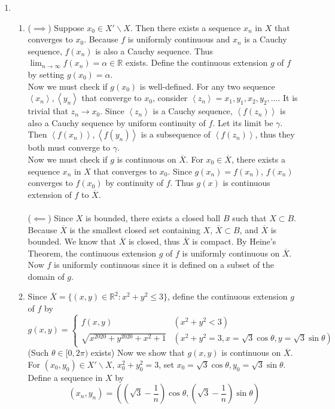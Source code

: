 \documentclass[11pt]{report}
\renewcommand{\span}[1]{\left\langle #1 \right\rangle}
\newcommand{\ra}{\rightarrow}
\newcommand{\bs}{\backslash}
\newcommand{\mimp}{$\implies$}
\newcommand{\R}{\mathbb{R}}
\begin{document}
\begin{enumerate}
\item 
\begin{enumerate}
	\item (\mimp) Suppose $x_0 \in X'\bs X$. Then there exists a sequence $x_n$ in $X$ that converges to $x_0$. Because $f$ is uniformly continuous and $x_n$ is a Cauchy sequence, $f(x_n)$ is also a Cauchy sequence. Thus $\lim_{n\ra\infty} f(x_n) = \alpha \in \R$ exists.  Define the continuous extension $g$ of $f$ by setting $g(x_0) = \alpha$.\\
	Now we must check if $g(x_0)$ is well-defined. For any two sequence $\span{x_n}, \span{y_n}$ that converge to $x_0$, consider $\span{z_n} = x_1, y_1, x_2, y_2, \dots$. It is trivial that $z_n\ra x_0$. Since $\span{z_n}$ is a Cauchy sequence, $\span{f(z_n)}$ is also a Cauchy sequence by uniform continuity of $f$. Let its limit be $\gamma$. Then $\span{f(x_n)}, \span{f(y_n)}$ is a subsequence of $\span{f(z_n)}$, thus they both must converge to $\gamma$.\\
	Now we must check if $g$ is continuous on $\overline{X}$. For $x_0\in \overline{X}$, there exists a sequence $x_n$ in $X$ that converges to $x_0$. Since $g(x_n) = f(x_n)$, $f(x_n)$ converges to $f(x_0)$ by continuity of $f$. Thus $g(x)$ is continuous extension of $f$ to $\overline{X}$.\\
	\\
	($\impliedby$) Since $X$ is bounded, there exists a closed ball $B$ such that $X\subset B$. Because $\overline{X}$ is the smallest closed set containing $X$, $\overline{X} \subset B$, and $\overline{X}$ is bounded. We know that $\overline{X}$ is closed, thus $\overline{X}$ is compact. By Heine's Theorem, the continuous extension $g$ of $f$ is uniformly continuous on $\overline{X}$. Now $f$ is uniformly continuous since it is defined on a subset of the domain of $g$.
	\item Since $\overline{X} = \{(x, y)\in \R^2: x^2+y^2\leq 3 \}$, define the continuous extension $g$ of $f$ by $$g(x, y) = \begin{cases}
		f(x, y) & (x^2+y^2 < 3)\\
		\sqrt{x^{2020} + y^{2020} + x^2 +1} & (x^2 + y^2 = 3, x = \sqrt{3}\cos\theta, y = \sqrt{3}\sin\theta)
	\end{cases}$$
	(Such $\theta \in [0, 2\pi)$ exists) Now we show that $g(x, y)$ is continuous on $\overline{X}$. For $(x_0, y_0)\in X'\bs X$, $x_0^2 + y_0^2 = 3$, set $x_0 = \sqrt{3}\cos\theta, y_0 = \sqrt{3}\sin\theta$. Define a sequence in $X$ by $$(x_n, y_n) = \left(\left(\sqrt{3} - \frac{1}{n}\right)\cos\theta, \left(\sqrt{3} - \frac{1}{n}\right)\sin\theta \right)$$

\end{enumerate}
\end{enumerate}
\end{document}

